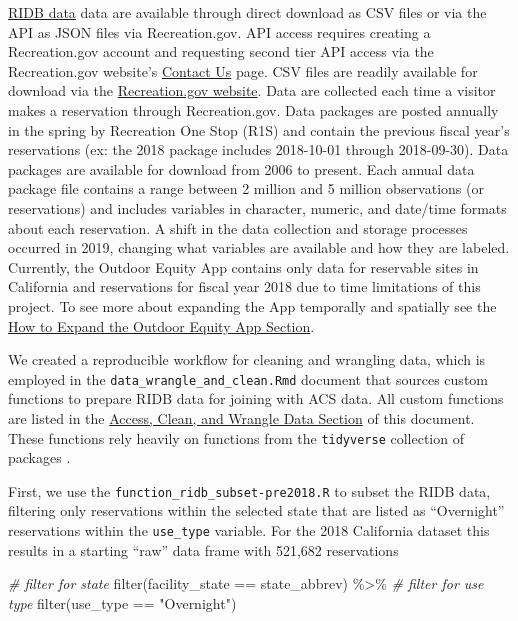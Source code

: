 \documentclass[
  11 pt,
  openany]{book}
\newenvironment{Shaded}{\begin{snugshade}}{\end{snugshade}}
\newcommand{\CommentTok}[1]{\textcolor[rgb]{0.56,0.35,0.01}{\textit{#1}}}
\newcommand{\FunctionTok}[1]{\textcolor[rgb]{0.00,0.00,0.00}{#1}}
\newcommand{\NormalTok}[1]{#1}
\newcommand{\SpecialCharTok}[1]{\textcolor[rgb]{0.00,0.00,0.00}{#1}}
\newcommand{\StringTok}[1]{\textcolor[rgb]{0.31,0.60,0.02}{#1}}
\begin{document}
\href{https://ridb.recreation.gov/landing}{RIDB data} data are available through direct download as CSV files or via the API as JSON files via Recreation.gov. API access requires creating a Recreation.gov account and requesting second tier API access via the Recreation.gov website's \href{https://recreationonestopprod.servicenowservices.com/external?id=external_contact_us}{Contact Us} page. CSV files are readily available for download via the \href{https://ridb.recreation.gov/download}{Recreation.gov website}. Data are collected each time a visitor makes a reservation through Recreation.gov. Data packages are posted annually in the spring by Recreation One Stop (R1S) and contain the previous fiscal year's reservations (ex: the 2018 package includes 2018-10-01 through 2018-09-30). Data packages are available for download from 2006 to present. Each annual data package file contains a range between 2 million and 5 million observations (or reservations) and includes variables in character, numeric, and date/time formats about each reservation. A shift in the data collection and storage processes occurred in 2019, changing what variables are available and how they are labeled. Currently, the Outdoor Equity App contains only data for reservable sites in California and reservations for fiscal year 2018 due to time limitations of this project. To see more about expanding the App temporally and spatially see the \protect\hyperlink{how-to-expand-the-outdoor-equity-app}{How to Expand the Outdoor Equity App Section}.

We created a reproducible workflow for cleaning and wrangling data, which is employed in the \texttt{data\_wrangle\_and\_clean.Rmd} document that sources custom functions to prepare RIDB data for joining with ACS data. All custom functions are listed in the \protect\hyperlink{access-clean-and-wrangle-data}{Access, Clean, and Wrangle Data Section} of this document. These functions rely heavily on functions from the \texttt{tidyverse} collection of packages \citep{R-tidyverse}.

First, we use the \texttt{function\_ridb\_subset-pre2018.R} to subset the RIDB data, filtering only reservations within the selected state that are listed as ``Overnight'' reservations within the \texttt{use\_type} variable. For the 2018 California dataset this results in a starting ``raw'' data frame with 521,682 reservations

\begin{Shaded}
\begin{Highlighting}[]
\CommentTok{\# filter for state}
\FunctionTok{filter}\NormalTok{(facility\_state }\SpecialCharTok{==}\NormalTok{ state\_abbrev) }\SpecialCharTok{\%\textgreater{}\%}
  \CommentTok{\# filter for use type}
  \FunctionTok{filter}\NormalTok{(use\_type }\SpecialCharTok{==} \StringTok{"Overnight"}\NormalTok{)}
\end{Highlighting}
\end{Shaded}
\end{document}

